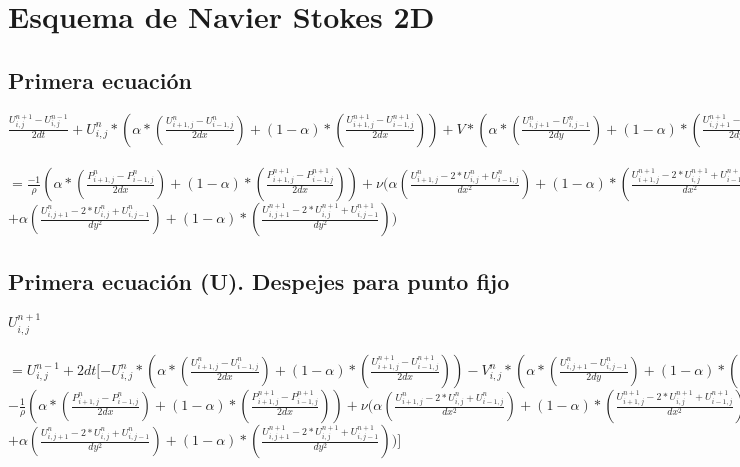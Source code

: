\documentclass[a4paper]{article}
\begin{document}
\newpage
\section{Esquema de Navier Stokes 2D}
\subsection{Primera ecuación}
$\frac{U^{n+1}_{i,j} - U^{n-1}_{i,j}}{2dt} + U^{n}_{i,j}*(\alpha * (\frac{U^{n}_{i+1,j} - U^{n}_{i-1,j}}{2dx}) + (1-\alpha) * (\frac{U^{n+1}_{i+1,j} - U^{n+1}_{i-1,j}}{2dx})) + V*(\alpha * (\frac{U^{n}_{i,j+1} - U^{n}_{i,j-1}}{2dy}) + (1-\alpha) * (\frac{U^{n+1}_{i,j+1} - U^{n+1}_{i,j-1}}{2dy}))$
\\
\\
$= \frac{-1}{\rho}(\alpha * (\frac{P^{n}_{i+1,j} - P^{n}_{i-1,j}}{2dx}) + (1-\alpha) * (\frac{P^{n+1}_{i+1,j} - P^{n+1}_{i-1,j}}{2dx})) + \nu (\alpha (\frac{ U^{n}_{i+1,j} - 2*U^{n}_{i,j} + U^{n}_{i-1,j}}{dx^2}) + (1-\alpha)*(\frac{ U^{n+1}_{i+1,j} - 2*U^{n+1}_{i,j} + U^{n+1}_{i-1,j}}{dx^2})$
\\
$+ \alpha (\frac{ U^{n}_{i,j+1} - 2*U^{n}_{i,j} + U^{n}_{i,j-1}}{dy^2}) + (1-\alpha)*(\frac{ U^{n+1}_{i,j+1} - 2*U^{n+1}_{i,j} + U^{n+1}_{i,j-1}}{dy^2}))$


\subsection{Primera ecuación (U). Despejes para punto fijo}
$U^{n+1}_{i,j} $
\\
\\
$= U^{n-1}_{i,j} + 2dt[- U^{n}_{i,j}*(\alpha * (\frac{U^{n}_{i+1,j} - U^{n}_{i-1,j}}{2dx}) + (1-\alpha) * (\frac{U^{n+1}_{i+1,j} - U^{n+1}_{i-1,j}}{2dx})) - V^{n}_{i,j}*(\alpha * (\frac{U^{n}_{i,j+1} - U^{n}_{i,j-1}}{2dy}) + (1-\alpha) * (\frac{U^{n+1}_{i,j+1} - U^{n+1}_{i,j-1}}{2dy}))$
\\
$ - \frac{1}{\rho}(\alpha * (\frac{P^{n}_{i+1,j} - P^{n}_{i-1,j}}{2dx}) + (1-\alpha) * (\frac{P^{n+1}_{i+1,j} - P^{n+1}_{i-1,j}}{2dx})) + \nu (\alpha (\frac{ U^{n}_{i+1,j} - 2*U^{n}_{i,j} + U^{n}_{i-1,j}}{dx^2}) + (1-\alpha)*(\frac{ U^{n+1}_{i+1,j} - 2*U^{n+1}_{i,j} + U^{n+1}_{i-1,j}}{dx^2})$
\\
$+ \alpha (\frac{ U^{n}_{i,j+1} - 2*U^{n}_{i,j} + U^{n}_{i,j-1}}{dy^2}) + (1-\alpha)*(\frac{ U^{n+1}_{i,j+1} - 2*U^{n+1}_{i,j} + U^{n+1}_{i,j-1}}{dy^2}))]$
\end{document}
